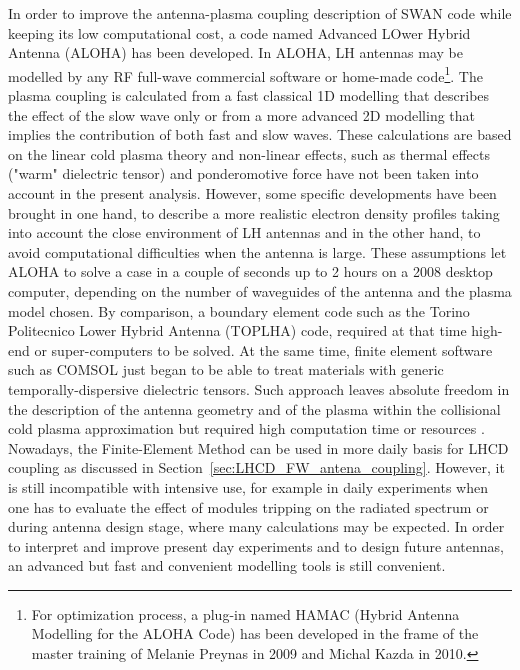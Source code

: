 In order to improve the antenna-plasma coupling description of SWAN code while keeping its low computational cost, a code named Advanced LOwer Hybrid Antenna (ALOHA) has been developed. In ALOHA, LH antennas may be modelled by any RF full-wave commercial software or home-made code\footnote{For optimization process, a plug-in named HAMAC (Hybrid Antenna Modelling for the ALOHA Code) has been developed in the frame of the master training of Melanie Preynas in 2009 and Michal Kazda in 2010.}. The plasma coupling is calculated from a fast classical 1D modelling that describes the effect of the slow wave only\cite{brambilla1976-1} or from a more advanced 2D modelling that implies the contribution of both fast and slow waves\cite{brambilla1979, bers1983, irzak1995}.
These calculations are based on the linear cold plasma theory and non-linear effects, such as thermal effects ("warm" dielectric tensor) and ponderomotive force have not been taken into account in the present analysis. However, some specific developments have been brought in one hand, to describe a more realistic electron density profiles taking into account the close environment of LH antennas and in the other hand, to avoid computational difficulties when the antenna is large. These assumptions let ALOHA to solve a case in a couple of seconds up to 2 hours on a 2008 desktop computer, depending on the number of waveguides of the antenna and the plasma model chosen. By comparison, a boundary element code such as the Torino Politecnico Lower Hybrid Antenna (TOPLHA) code, required at that time high-end or super-computers to be solved. At the same time, finite element software such as COMSOL just began to be able to treat materials with generic temporally-dispersive dielectric tensors. Such approach leaves absolute freedom in the description of the antenna geometry and of the plasma within the collisional cold plasma approximation but required high computation time or resources . Nowadays, the Finite-Element Method can be used in more daily basis for LHCD coupling as discussed in Section~\ref{sec:LHCD_FW_antena_coupling}. However, it is still incompatible with intensive use, for example in daily experiments when one has to evaluate the effect of modules tripping on the radiated spectrum or during antenna design stage, where many calculations may be expected. In order to interpret and improve present day experiments and to design future antennas, an advanced but fast and convenient modelling tools is still convenient.

